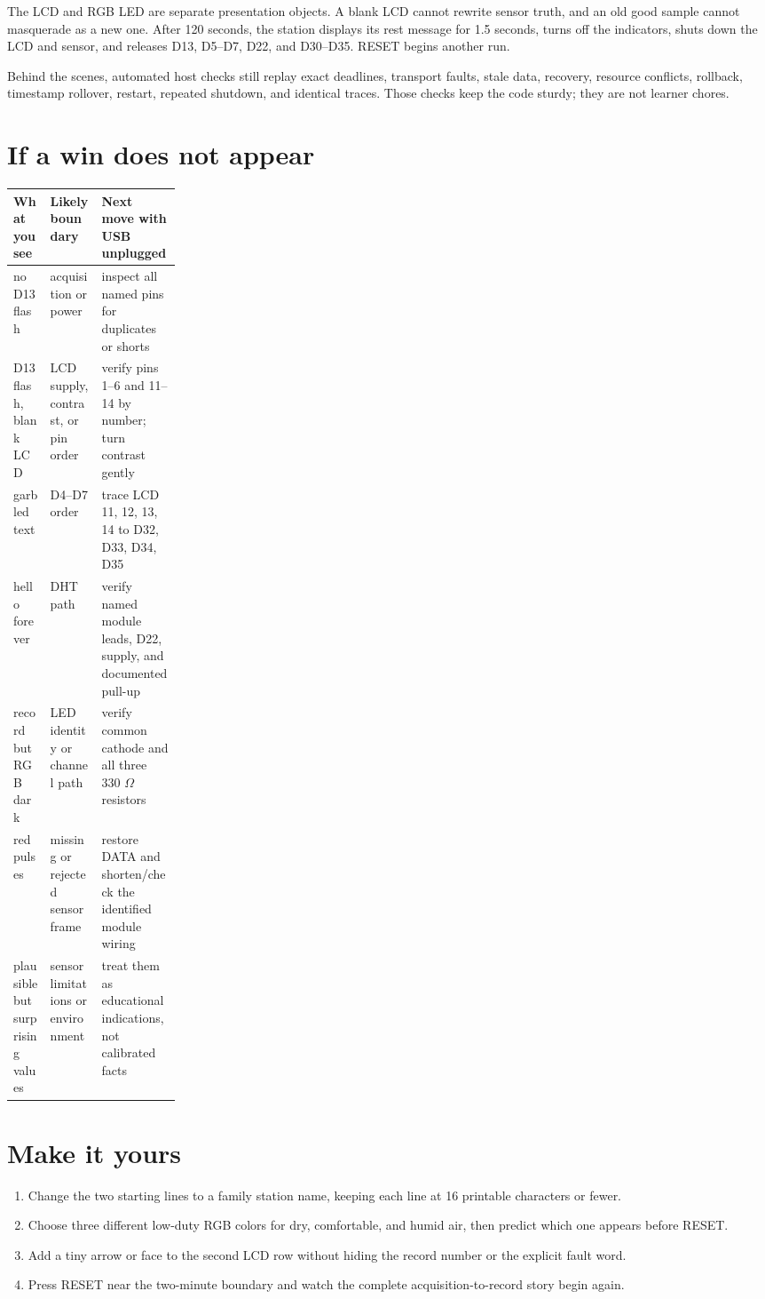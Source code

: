\documentclass[11pt]{article}
\begin{document}
The LCD and RGB LED are separate presentation objects. A blank LCD cannot
rewrite sensor truth, and an old good sample cannot masquerade as a new one.
After 120 seconds, the station displays its rest message for 1.5 seconds, turns
off the indicators, shuts down the LCD and sensor, and releases D13, D5--D7,
D22, and D30--D35. RESET begins another run.

Behind the scenes, automated host checks still replay exact deadlines,
transport faults, stale data, recovery, resource conflicts, rollback,
timestamp rollover, restart, repeated shutdown, and identical traces. Those
checks keep the code sturdy; they are not learner chores.

\section{If a win does not appear}

\begin{tabularx}{\linewidth}{@{}p{0.22\linewidth} X X@{}}
\toprule
What you see & Likely boundary & Next move with USB unplugged\\
\midrule
no D13 flash & acquisition or power & inspect all named pins for duplicates or shorts\\
D13 flash, blank LCD & LCD supply, contrast, or pin order & verify pins 1--6 and 11--14 by number; turn contrast gently\\
garbled text & D4--D7 order & trace LCD 11, 12, 13, 14 to D32, D33, D34, D35\\
hello forever & DHT path & verify named module leads, D22, supply, and documented pull-up\\
record but RGB dark & LED identity or channel path & verify common cathode and all three 330 \(\Omega\) resistors\\
red pulses & missing or rejected sensor frame & restore DATA and shorten/check the identified module wiring\\
plausible but surprising values & sensor limitations or environment & treat them as educational indications, not calibrated facts\\
\bottomrule
\end{tabularx}

\section{Make it yours}

\begin{enumerate}
  \item Change the two starting lines to a family station name, keeping each
        line at 16 printable characters or fewer.
  \item Choose three different low-duty RGB colors for dry, comfortable, and
        humid air, then predict which one appears before RESET.
  \item Add a tiny arrow or face to the second LCD row without hiding the
        record number or the explicit fault word.
  \item Press RESET near the two-minute boundary and watch the complete
        acquisition-to-record story begin again.
\end{enumerate}
\end{document}
